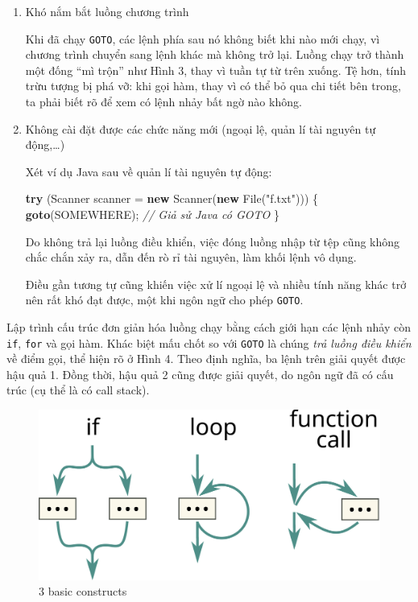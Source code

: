 \documentclass[
]{article}
\newenvironment{Shaded}{}{}
\newcommand{\BuiltInTok}[1]{#1}
\newcommand{\CommentTok}[1]{\textcolor[rgb]{0.38,0.63,0.69}{\textit{#1}}}
\newcommand{\ControlFlowTok}[1]{\textcolor[rgb]{0.00,0.44,0.13}{\textbf{#1}}}
\newcommand{\KeywordTok}[1]{\textcolor[rgb]{0.00,0.44,0.13}{\textbf{#1}}}
\newcommand{\NormalTok}[1]{#1}
\newcommand{\OperatorTok}[1]{\textcolor[rgb]{0.40,0.40,0.40}{#1}}
\newcommand{\StringTok}[1]{\textcolor[rgb]{0.25,0.44,0.63}{#1}}
\begin{document}
\begin{enumerate}
\def\labelenumi{\arabic{enumi}.}
\item
  Khó nắm bắt luồng chương trình

  Khi đã chạy \texttt{GOTO}, các lệnh phía sau nó không biết khi nào mới
  chạy, vì chương trình chuyển sang lệnh khác mà không trở lại. Luồng
  chạy trở thành một đống ``mì trộn'' như Hình 3, thay vì tuần tự từ
  trên xuống. Tệ hơn, tính trừu tượng bị phá vỡ: khi gọi hàm, thay vì có
  thể bỏ qua chi tiết bên trong, ta phải biết rõ để xem có lệnh nhảy bất
  ngờ nào không.
\item
  Không cài đặt được các chức năng mới (ngoại lệ, quản lí tài nguyên tự
  động,\ldots)

  Xét ví dụ Java sau về quản lí tài nguyên tự động:

\begin{Shaded}
\begin{Highlighting}[]
\ControlFlowTok{try} \OperatorTok{(}\BuiltInTok{Scanner}\NormalTok{ scanner }\OperatorTok{=} \KeywordTok{new} \BuiltInTok{Scanner}\OperatorTok{(}\KeywordTok{new} \BuiltInTok{File}\OperatorTok{(}\StringTok{"f.txt"}\OperatorTok{)))} \OperatorTok{\{}
    \ControlFlowTok{goto}\OperatorTok{(}\NormalTok{SOMEWHERE}\OperatorTok{);}    \CommentTok{// Giả sử Java có GOTO}
\OperatorTok{\}}
\end{Highlighting}
\end{Shaded}

  Do không trả lại luồng điều khiển, việc đóng luồng nhập từ tệp cũng
  không chắc chắn xảy ra, dẫn đến rò rỉ tài nguyên, làm khối lệnh vô
  dụng.

  Điều gần tương tự cũng khiến việc xử lí ngoại lệ và nhiều tính năng
  khác trở nên rất khó đạt được, một khi ngôn ngữ cho phép
  \texttt{GOTO}.
\end{enumerate}

Lập trình cấu trúc đơn giản hóa luồng chạy bằng cách giới hạn các lệnh
nhảy còn \texttt{if}, \texttt{for} và gọi hàm. Khác biệt mấu chốt so với
\texttt{GOTO} là chúng \emph{trả luồng điều khiển} về điểm gọi, thể hiện
rõ ở Hình 4. Theo định nghĩa, ba lệnh trên giải quyết được hậu quả 1.
Đồng thời, hậu quả 2 cũng được giải quyết, do ngôn ngữ đã có cấu trúc
(cụ thể là có call stack).

\begin{figure}
\centering
\includegraphics{../images/control-schematics.svg}
\caption{3 basic constructs}
\end{figure}
\end{document}
